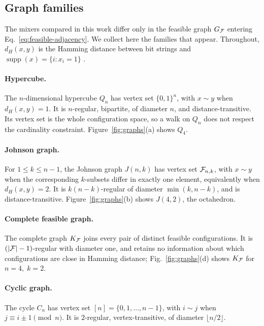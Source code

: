 \subsection{\label{subsec:graph-zoo}Graph families}

The mixers compared in this work differ only in the feasible graph $G_{\mathcal{F}}$ entering Eq.~\eqref{eq:feasible-adjacency}. We collect here the families that appear. Throughout, $d_H(x,y)$ is the Hamming distance between bit strings and $\operatorname{supp}(x)=\{i:x_i=1\}$ .

\paragraph*{Hypercube.} The $n$-dimensional hypercube $Q_n$ has vertex set
$\{0,1\}^{n}$, with $x\sim y$ when $d_H(x,y)=1$. It is $n$-regular, bipartite, of diameter $n$, and distance-transitive. Its vertex set is the whole configuration space, so a walk on $Q_n$ does not respect the cardinality constraint. Figure~\ref{fig:graphs}(a) shows $Q_4$.

\paragraph*{Johnson graph.} For $1\le k\le n-1$, the Johnson graph $J(n,k)$
has vertex set $\mathcal{F}_{n,k}$, with $x\sim y$ when the corresponding $k$-subsets differ in exactly one element, equivalently when $d_H(x,y)=2$. It is $k(n-k)$-regular of diameter $\min(k,n-k)$, and is distance-transitive. Figure~\ref{fig:graphs}(b) shows $J(4,2)$, the octahedron.

\paragraph*{Complete feasible graph.} The complete graph $K_{\mathcal{F}}$ joins every
pair of distinct feasible configurations. It is $(|\mathcal{F}|-1)$-regular with diameter one, and retains no information about which configurations are close in Hamming distance; Fig.~\ref{fig:graphs}(d) shows $K_{\mathcal{F}}$ for $n = 4, \; k = 2$.

\paragraph*{Cyclic graph.} The cycle $C_n$ has vertex set $ [n] = \{0,1,\dots,n-1\}$, with
$i\sim j$ when $j\equiv i\pm1\pmod n$. It is $2$-regular, vertex-transitive, of diameter $\lfloor n/2\rfloor$.

